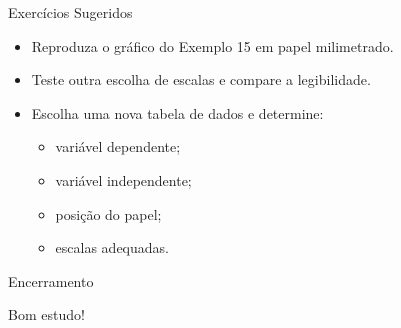 \documentclass[aspectratio=169]{beamer}
\begin{document}
\begin{frame}{Exercícios Sugeridos}
\begin{itemize}
\item Reproduza o gráfico do Exemplo 15 em papel milimetrado.
\item Teste outra escolha de escalas e compare a legibilidade.
\item Escolha uma nova tabela de dados e determine:
\begin{itemize}
\item variável dependente;
\item variável independente;
\item posição do papel;
\item escalas adequadas.
\end{itemize}
\end{itemize}
\end{frame}

\begin{frame}{Encerramento}
\begin{center}
\Large Bom estudo!
\end{center}
\end{frame}
\end{document}

